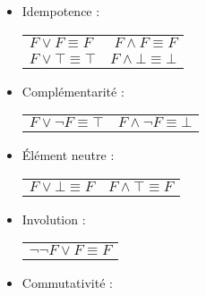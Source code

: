 \documentclass[11pt,twoside,openright,a4paper]{report}
\begin{document}
\begin{itemize}
	\item Idempotence :\\
	
	\begin{center}

		\begin{tabular}{lr}
			$F \lor F \equiv F$ & $F \land F \equiv F$ \\
			$F \lor \top \equiv \top$ & $F \land \bot \equiv \bot$\\
		\end{tabular}
	
	\end{center}

	\item Complémentarité :\\

	\begin{center}

		\begin{tabular}{lr}
			$F \lor \neg F \equiv \top$ & $F \land \neg F \equiv \bot$ \\
		\end{tabular}
	
	\end{center}

	\item Élément neutre :\\

	\begin{center}

		\begin{tabular}{lr}
			$F \lor \bot \equiv F$ & $F \land \top \equiv F$ \\
		\end{tabular}
	
	\end{center}

	\item Involution :\\

	\begin{center}

		\begin{tabular}{c}
			$\neg \neg F \lor F \equiv F$ \\
		\end{tabular}
	
	\end{center}

	\item Commutativité :\\


\end{itemize}
\end{document}
